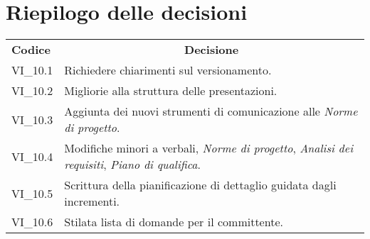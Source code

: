 % 
\section{Riepilogo delle decisioni}
\begin{longtable} {
		>{\centering}p{17mm} 
		>{}p{120mm}}
	\rowcolor{gray!50}
	\textbf{Codice} & \multicolumn{1}{c}{\textbf{Decisione}} \\
	VI\_10.1 & Richiedere chiarimenti sul versionamento. \TBstrut \\ [2mm]
	VI\_10.2 & Migliorie alla struttura delle presentazioni. \TBstrut \\ [2mm]
	VI\_10.3 & Aggiunta dei nuovi strumenti di comunicazione alle \textit{Norme di progetto}. \TBstrut \\ [2mm]
	VI\_10.4 & Modifiche minori a verbali, \textit{Norme di progetto}, \textit{Analisi dei requisiti}, \textit{Piano di qualifica}. \TBstrut \\ [2mm]
	VI\_10.5 & Scrittura della pianificazione di dettaglio guidata dagli incrementi. \TBstrut \\ [2mm]
	VI\_10.6 & Stilata lista di domande per il committente. \TBstrut \\ [2mm]
\end{longtable}